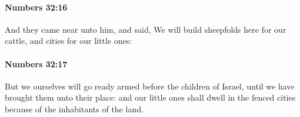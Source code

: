 		\paragraph{Numbers 32:16} %
			\label{NUMBERS-32-16}

			And they came near unto him, and said, We will build sheepfolds here for our cattle, and cities for our little ones:


		\paragraph{Numbers 32:17} %
			\label{NUMBERS-32-17}

			But we ourselves will go ready armed before the children of Israel, until we have brought them unto their place: and our little ones shall dwell in the fenced cities because of the inhabitants of the land.


